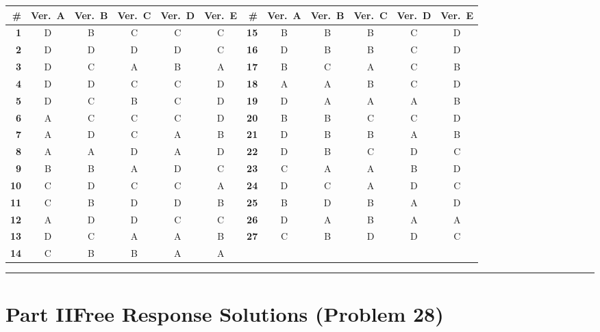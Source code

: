 \documentclass[12pt]{article}
\begin{document}
\vspace{0.6em}
{\small
\begin{center}
\renewcommand{\arraystretch}{1.08}
\setlength{\tabcolsep}{5.5pt}
\begin{tabular}{r ccccc @{\hspace{2em}} r ccccc}
  \toprule
  \textbf{\#} & \textbf{Ver.\ A} & \textbf{Ver.\ B} & \textbf{Ver.\ C} & \textbf{Ver.\ D} & \textbf{Ver.\ E} &
  \textbf{\#} & \textbf{Ver.\ A} & \textbf{Ver.\ B} & \textbf{Ver.\ C} & \textbf{Ver.\ D} & \textbf{Ver.\ E} \\
  \midrule
  \textbf{1}  & D & B & C & C & C &  \textbf{15} & B & B & B & C & D \\
  \textbf{2}  & D & D & D & D & C &  \textbf{16} & D & B & B & C & D \\
  \textbf{3}  & D & C & A & B & A &  \textbf{17} & B & C & A & C & B \\
  \textbf{4}  & D & D & C & C & D &  \textbf{18} & A & A & B & C & D \\
  \textbf{5}  & D & C & B & C & D &  \textbf{19} & D & A & A & A & B \\
  \textbf{6}  & A & C & C & C & D &  \textbf{20} & B & B & C & C & D \\
  \textbf{7}  & A & D & C & A & B &  \textbf{21} & D & B & B & A & B \\
  \textbf{8}  & A & A & D & A & D &  \textbf{22} & D & B & C & D & C \\
  \textbf{9}  & B & B & A & D & C &  \textbf{23} & C & A & A & B & D \\
  \textbf{10} & C & D & C & C & A &  \textbf{24} & D & C & A & D & C \\
  \textbf{11} & C & B & D & D & B &  \textbf{25} & B & D & B & A & D \\
  \textbf{12} & A & D & D & C & C &  \textbf{26} & D & A & B & A & A \\
  \textbf{13} & D & C & A & A & B &  \textbf{27} & C & B & D & D & C \\
  \textbf{14} & C & B & B & A & A &              &   &   &   &   &   \\
  \bottomrule
\end{tabular}
\end{center}
}

\vspace{1em}
\noindent\rule{\linewidth}{0.6pt}
\vspace{0.5em}

\section*{Part II\quad Free Response Solutions (Problem 28)}
\end{document}

